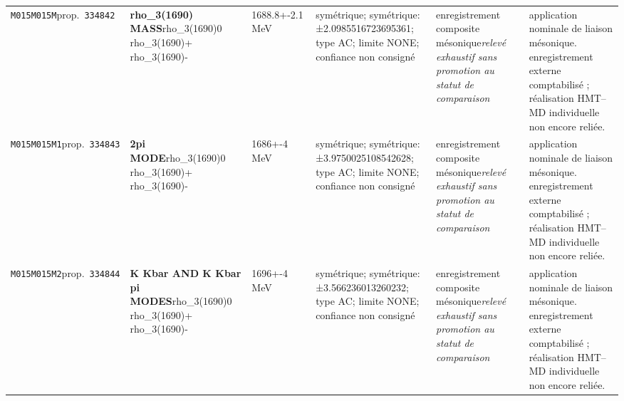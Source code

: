 \begin{landscape}
\begin{longtable}{L{1.85cm}L{4.45cm}L{2.35cm}L{4.05cm}L{3.35cm}L{7.15cm}}
\texttt{M015}\newline \texttt{M015M}\newline prop.\ \texttt{334842} & \textbf{rho\_\allowbreak{}3(1690) MASS}\newline rho\_\allowbreak{}3(1690)0 \textbar{}\allowbreak{} rho\_\allowbreak{}3(1690)+ \textbar{}\allowbreak{} rho\_\allowbreak{}3(1690)- & 1688.8+-2.1\,MeV & symétrique; symétrique: ±2.0985516723695361; type AC; limite NONE; confiance non consigné & enregistrement composite mésonique\newline \emph{relevé exhaustif sans promotion au statut de comparaison} & application nominale de liaison mésonique. enregistrement externe comptabilisé ; réalisation HMT--MD individuelle non encore reliée. \\
\texttt{M015}\newline \texttt{M015M1}\newline prop.\ \texttt{334843} & \textbf{2pi MODE}\newline rho\_\allowbreak{}3(1690)0 \textbar{}\allowbreak{} rho\_\allowbreak{}3(1690)+ \textbar{}\allowbreak{} rho\_\allowbreak{}3(1690)- & 1686+-4\,MeV & symétrique; symétrique: ±3.9750025108542628; type AC; limite NONE; confiance non consigné & enregistrement composite mésonique\newline \emph{relevé exhaustif sans promotion au statut de comparaison} & application nominale de liaison mésonique. enregistrement externe comptabilisé ; réalisation HMT--MD individuelle non encore reliée. \\
\texttt{M015}\newline \texttt{M015M2}\newline prop.\ \texttt{334844} & \textbf{K Kbar AND K Kbar pi MODES}\newline rho\_\allowbreak{}3(1690)0 \textbar{}\allowbreak{} rho\_\allowbreak{}3(1690)+ \textbar{}\allowbreak{} rho\_\allowbreak{}3(1690)- & 1696+-4\,MeV & symétrique; symétrique: ±3.566236013260232; type AC; limite NONE; confiance non consigné & enregistrement composite mésonique\newline \emph{relevé exhaustif sans promotion au statut de comparaison} & application nominale de liaison mésonique. enregistrement externe comptabilisé ; réalisation HMT--MD individuelle non encore reliée. \\

\end{longtable}
\end{landscape}
